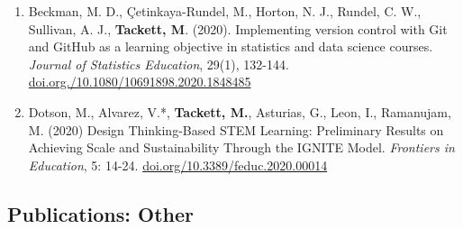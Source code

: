 \documentclass[11pt,dvipsnames]{article}
\begin{document}
\begin{enumerate}
{  Hearing Research}, 66(1), 314-324.
  \href{https://doi.org/10.1044/2022_JSLHR-22-00327}{doi.org/10.1044/2022\_JSLHR-22-00327}
\item
  Beckman, M. D., Çetinkaya-Rundel, M., Horton, N. J., Rundel, C. W.,
  Sullivan, A. J., \textbf{Tackett, M}. (2020). Implementing version
  control with Git and GitHub as a learning objective in statistics and
  data science courses. \emph{Journal of Statistics Education}, 29(1),
  132-144.
  \href{https://doi.org./10.1080/10691898.2020.1848485}{doi.org./10.1080/10691898.2020.1848485}
\item
  Dotson, M., Alvarez, V.*, \textbf{Tackett, M.}, Asturias, G., Leon,
  I., Ramanujam, M. (2020) Design Thinking-Based STEM Learning:
  Preliminary Results on Achieving Scale and Sustainability Through the
  IGNITE Model. \emph{Frontiers in Education}, 5: 14-24.
  \href{https://doi.org/10.3389/feduc.2020.00014}{doi.org/10.3389/feduc.2020.00014}
\end{enumerate}

\hypertarget{publications-other}{%
\subsection{Publications: Other}\label{publications-other}}
\end{document}

